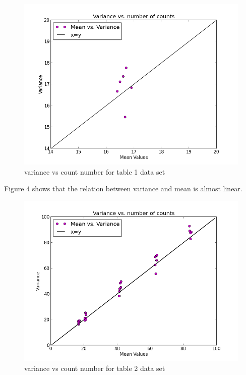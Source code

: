 \documentclass[letterpaper,12pt]{article}
\begin{document}
\begin{figure}
\centering
\includegraphics[scale=0.6]{variance-vs-count-number-400.png}
\caption{variance vs count number for table 1 data set}
\end{figure}

Figure 4 shows that the relation between variance and mean is almost linear.

\begin{figure}
\centering
\includegraphics[scale=0.6]{variance-all-together.png}
\caption{variance vs count number for table 2 data set}
\end{figure}
\end{document}
